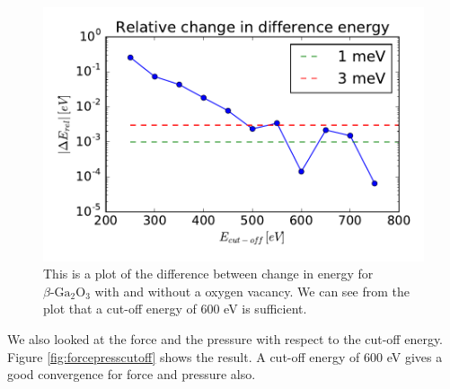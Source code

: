 \begin{figure}[H]
\includegraphics[width=\linewidth]{../fig/deltatotencurverel.pdf}\caption{This is a plot of the difference between change in energy for $\beta \text{-Ga}_2\text{O}_3$ with and without a oxygen vacancy. We can see from the plot that a cut-off energy of 600 eV is sufficient.}\label{fig:totencutoff}
\end{figure}

We also looked at the force and the pressure with respect to the cut-off energy. Figure \ref{fig:forcepresscutoff} shows the result. A cut-off energy of 600 eV gives a good convergence for force and pressure also. 

